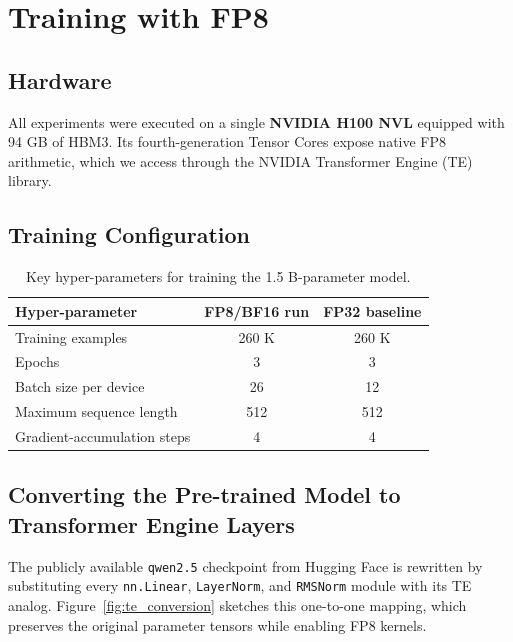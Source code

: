 \section{Training with \texorpdfstring{FP8}{FP8}}

\subsection{Hardware}
All experiments were executed on a single \textbf{NVIDIA H100 NVL} equipped with 94 GB of HBM3. Its fourth-generation Tensor Cores expose native FP8 arithmetic, which we access through the NVIDIA Transformer Engine (TE) library\cite{transformer_engine}.

\subsection{Training Configuration}
\vspace{-0.5em}
\begin{table}[htbp]
    \centering\small
    \begin{tabular}{lcc}
        \toprule
        \textbf{Hyper-parameter} & \textbf{FP8/BF16 run} & \textbf{FP32 baseline}\\
        \midrule
        Training examples                & 260 K & 260 K\\
        Epochs                           & 3     & 3\\
        Batch size per device            & 26    & 12\\
        Maximum sequence length          & 512   & 512\\
        Gradient-accumulation steps      & 4     & 4\\
        \bottomrule
    \end{tabular}
    \caption{Key hyper-parameters for training the 1.5 B-parameter model.}
    \label{tab:fp8_config}
\end{table}

\subsection{Converting the Pre-trained Model to Transformer Engine Layers}
The publicly available \texttt{qwen2.5} checkpoint from Hugging Face is rewritten by substituting every \texttt{nn.Linear}, \texttt{LayerNorm}, and \texttt{RMSNorm} module with its TE analog. Figure~\ref{fig:te_conversion} sketches this one-to-one mapping, which preserves the original parameter tensors while enabling FP8 kernels.

